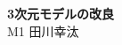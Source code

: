 \documentclass[]{jarticle}          %
\begin{document}

\vspace*{2ex}
\begin{center}
 {\Large \bf 3次元モデルの改良}\\ %
 \vspace*{5mm}
 {\large M1 田川幸汰}%
\end{center}





\end{document}
